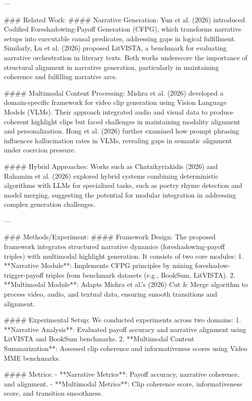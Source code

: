 ---

### Related Work:
#### Narrative Generation:
Yun et al. (2026) introduced Codified Foreshadowing-Payoff Generation (CFPG), which transforms narrative setups into executable causal predicates, addressing gaps in logical fulfillment. Similarly, Lu et al. (2026) proposed LitVISTA, a benchmark for evaluating narrative orchestration in literary texts. Both works underscore the importance of structural alignment in narrative generation, particularly in maintaining coherence and fulfilling narrative arcs.

#### Multimodal Content Processing:
Mishra et al. (2026) developed a domain-specific framework for video clip generation using Vision Language Models (VLMs). Their approach integrated audio and visual data to produce coherent highlight clips but faced challenges in maintaining modality alignment and personalization. Hong et al. (2026) further examined how prompt phrasing influences hallucination rates in VLMs, revealing gaps in semantic alignment under coercion pressure.

#### Hybrid Approaches:
Works such as Chatzikyriakidis (2026) and Rahamim et al. (2026) explored hybrid systems combining deterministic algorithms with LLMs for specialized tasks, such as poetry rhyme detection and model merging, suggesting the potential for modular integration in addressing complex generation challenges.

---

### Methods/Experiment:
#### Framework Design:
The proposed framework integrates structured narrative dynamics (foreshadowing-payoff triples) with multimodal highlight generation. It consists of two core modules:
1. **Narrative Module**: Implements CFPG principles by mining foreshadow-trigger-payoff triples from benchmark datasets (e.g., BookSum, LitVISTA).
2. **Multimodal Module**: Adapts Mishra et al.’s (2026) Cut & Merge algorithm to process video, audio, and textual data, ensuring smooth transitions and alignment.

#### Experimental Setup:
We conducted experiments across two domains:
1. **Narrative Analysis**: Evaluated payoff accuracy and narrative alignment using LitVISTA and BookSum benchmarks.
2. **Multimodal Content Summarization**: Assessed clip coherence and informativeness scores using Video MME benchmarks.

#### Metrics:
- **Narrative Metrics**: Payoff accuracy, narrative coherence, and alignment.
- **Multimodal Metrics**: Clip coherence score, informativeness score, and transition smoothness.

